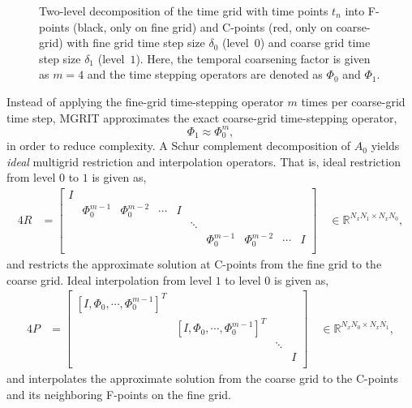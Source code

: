 \documentclass[3p]{elsarticle}
\begin{document}
\begin{figure}[ht!]
        \caption{Two-level decomposition of the time grid with time points $t_n$
            into F-points (black, only on fine grid) and C-points (red, only on coarse-grid)
            with fine grid time step size $\delta_0$ (level~$0$)
            and coarse grid time step size $\delta_1$ (level~$1$).
            Here, the temporal coarsening factor is given as $m = 4$
            and the time stepping operators are denoted as $\Phi_0$ and $\Phi_1$.}
    \label{time-grid-hierarchy-fig}
\end{figure}

Instead of applying the fine-grid time-stepping operator $m$ times per coarse-grid time step,
MGRIT approximates the exact coarse-grid time-stepping operator,
\begin{equation}
    \Phi_1 \approx \Phi_0^m,
\end{equation}
in order to reduce complexity.
A Schur complement decomposition of $A_0$ yields \emph{ideal} multigrid restriction and interpolation operators.
That is, ideal restriction from level $0$ to $1$  is given as,
\begin{alignat}{4}
    R &= \begin{bmatrix}
        I \\
        & \Phi_0^{m - 1} & \Phi_0^{m - 2} & \cdots & I \\
        &                        &                                &           &   & \ddots \\
        &                        &                                &           &   &        & \Phi_0^{m - 1} & \Phi_0^{m - 2} & \cdots & I \\
    \end{bmatrix} \quad \in \mathbb{R}^{N_x N_1 \times N_x N_0},
    \label{Rl-eqn}
\end{alignat}
and restricts the approximate solution at C-points
from the fine grid to the coarse grid.
Ideal interpolation from level $1$ to level $0$ is given as,
\begin{alignat}{4}
    P &= \begin{bmatrix}
        [I, \Phi_0, \cdots, \Phi_0^{m - 1}]^T \\
        & [I, \Phi_0, \cdots, \Phi_0^{m - 1}]^T \\
        && \ddots \\
        &&& I \\
    \end{bmatrix} \quad \in \mathbb{R}^{N_x N_0 \times N_x N_1},
    \label{Pl-eqn}
\end{alignat}
and interpolates the approximate solution
from the coarse grid to the C-points and its neighboring F-points
on the fine grid.
\end{document}
